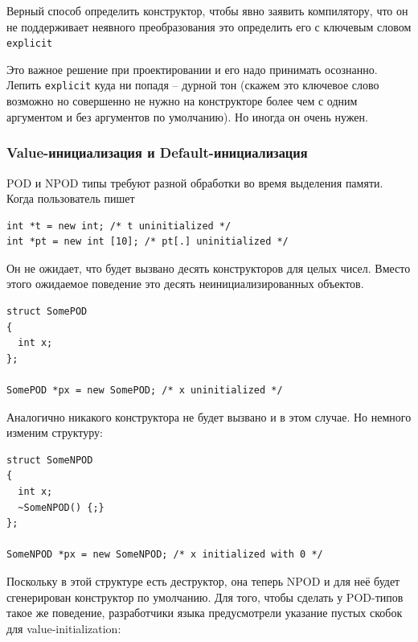 \documentclass[a4paper,12pt,oneside]{article}
\begin{document}


Верный способ определить конструктор, чтобы явно заявить компилятору, что он не поддерживает неявного преобразования это определить его с ключевым словом \lstinline!explicit!



Это важное решение при проектировании и его надо принимать осознанно. Лепить \lstinline!explicit! куда ни попадя -- дурной тон (скажем это ключевое слово возможно но совершенно не нужно на конструкторе более чем с одним аргументом и без аргументов по умолчанию). Но иногда он очень нужен.

\subsubsection{Value-инициализация и Default-инициализация}\label{ValDefInit}

POD и NPOD типы требуют разной обработки во время выделения памяти. Когда пользователь пишет

\begin{lstlisting}
int *t = new int; /* t uninitialized */
int *pt = new int [10]; /* pt[.] uninitialized */
\end{lstlisting}

Он не ожидает, что будет вызвано десять конструкторов для целых чисел. Вместо этого ожидаемое поведение это десять неинициализированных объектов.

\begin{lstlisting}
struct SomePOD
{
  int x;
};

SomePOD *px = new SomePOD; /* x uninitialized */
\end{lstlisting}

Аналогично никакого конструктора не будет вызвано и в этом случае. Но немного изменим структуру:

\begin{lstlisting}
struct SomeNPOD
{
  int x;
  ~SomeNPOD() {;}
};

SomeNPOD *px = new SomeNPOD; /* x initialized with 0 */
\end{lstlisting}

Поскольку в этой структуре есть деструктор, она теперь NPOD и для неё будет сгенерирован конструктор по умолчанию. Для того, чтобы сделать у POD-типов такое же поведение, разработчики языка предусмотрели указание пустых скобок для value-initialization:
\end{document}
